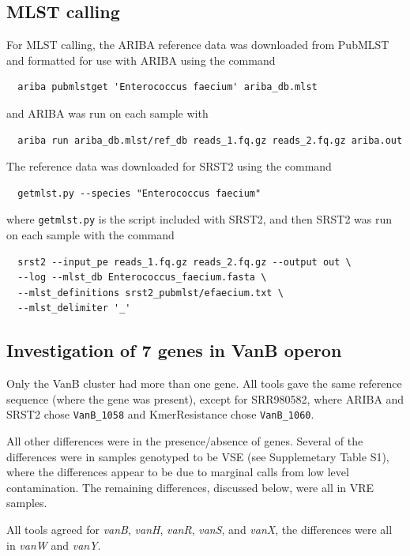 \documentclass[11pt, a4paper]{article}
\begin{document}
\subsection{MLST calling}
For MLST calling, the ARIBA reference data was downloaded from
PubMLST and formatted for use with ARIBA using the command
\begin{verbatim}
  ariba pubmlstget 'Enterococcus faecium' ariba_db.mlst
\end{verbatim}
and ARIBA was run on each sample with
\begin{verbatim}
  ariba run ariba_db.mlst/ref_db reads_1.fq.gz reads_2.fq.gz ariba.out
\end{verbatim}
The reference data was downloaded for SRST2 using the command
\begin{verbatim}
  getmlst.py --species "Enterococcus faecium"
\end{verbatim}
where \verb+getmlst.py+ is the script included with SRST2, and
then SRST2 was run on each sample with the command
\begin{verbatim}
  srst2 --input_pe reads_1.fq.gz reads_2.fq.gz --output out \
  --log --mlst_db Enterococcus_faecium.fasta \
  --mlst_definitions srst2_pubmlst/efaecium.txt \
  --mlst_delimiter '_'
\end{verbatim}


\subsection{Investigation of 7 genes in VanB operon}


Only the VanB cluster had more than one gene. All tools gave the same
reference sequence (where the gene was present), except for SRR980582, where
ARIBA and SRST2 chose \texttt{VanB\_1058} and KmerResistance
chose \texttt{VanB\_1060}.


All other differences were in the presence/absence of genes. Several of the
differences were in samples genotyped to be VSE (see Supplemetary Table S1),
where the differences appear to be due to marginal calls from low level
contamination. The remaining differences, discussed below, were all in VRE
samples.

All tools agreed for \textit{vanB}, \textit{vanH}, \textit{vanR},
\textit{vanS}, and \textit{vanX}, the differences were
all in \textit{vanW} and \textit{vanY}.
\end{document}
